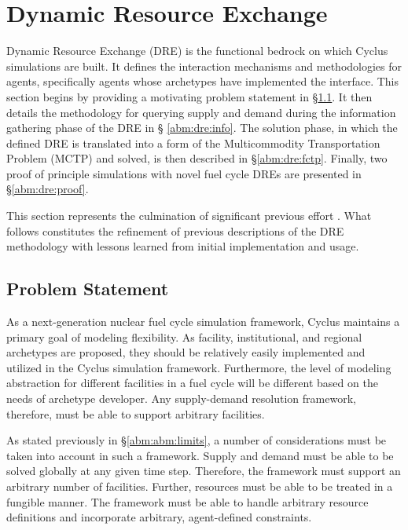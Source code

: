\section{Dynamic Resource Exchange}\label{abm:dre}

Dynamic Resource Exchange (DRE) is the functional bedrock on which Cyclus
simulations are built. It defines the interaction mechanisms and methodologies
for agents, specifically agents whose archetypes have implemented the
 interface. This section begins by providing a motivating problem
statement in \S \ref{abm:dre:prob}. It then details the methodology for querying
supply and demand during the information gathering phase of the DRE in \S
\ref{abm:dre:info}. The solution phase, in which the defined DRE is translated
into a form of the Multicommodity Transportation Problem (MCTP) and solved, is
then described in \S \ref{abm:dre:fctp}. Finally, two proof of principle
simulations with novel fuel cycle DREs are presented in \S \ref{abm:dre:proof}.

This section represents the culmination of significant previous effort
\cite{gidden_agent-based_2013, gidden_agent-based_2014,
  gidden_agent-based_slc_2013}. What follows constitutes the refinement of
previous descriptions of the DRE methodology with lessons learned from initial
implementation and usage.

\subsection{Problem Statement}\label{abm:dre:prob}

As a next-generation nuclear fuel cycle simulation framework, Cyclus maintains a
primary goal of modeling flexibility. As facility, institutional, and regional
archetypes are proposed, they should be relatively easily implemented and
utilized in the Cyclus simulation framework. Furthermore, the level of modeling
abstraction for different facilities in a fuel cycle will be different based on
the needs of archetype developer. Any supply-demand resolution framework,
therefore, must be able to support arbitrary facilities. 

As stated previously in \S \ref{abm:abm:limits}, a number of considerations must
be taken into account in such a framework. Supply and demand must be able to be
solved globally at any given time step. Therefore, the framework must support an
arbitrary number of facilities. Further, resources must be able to be treated in
a fungible manner. The framework must be able to handle arbitrary resource
definitions and incorporate arbitrary, agent-defined constraints.

